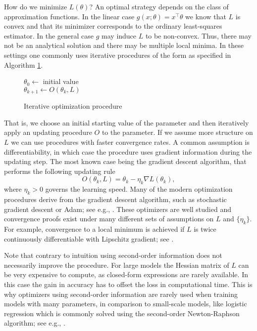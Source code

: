 How do we minimize $L(\theta)$? An optimal strategy depends on the class of
approximation functions. In the linear case $g(x; \theta) = x^\top \theta$ we know that
$L$ is convex and that its minimizer corresponds to the ordinary least-squares
estimator. In the general case $g$ may induce $L$ to be non-convex. Thus, there may not
be an analytical solution and there may be multiple local minima. In these settings one
commonly uses iterative procedures of the form as specified in Algorithm
\ref{alg:optimizer}.
\vspace{-1em}
\begin{figure}[!ht]
    \centering
    \begin{minipage}{.7\linewidth}
        \begin{algorithm}[H]
            \begin{algorithmic}[1]
                \State $\theta_0 \gets$ initial value
                \\
                $\theta_{k+1} \gets O(\theta_k, L)$
                \EndWhile
            \end{algorithmic}
        \caption{Iterative optimization procedure}
        \label{alg:optimizer}
        \end{algorithm}
    \end{minipage}
\end{figure}
That is, we choose an initial starting value of the parameter and then iteratively apply
an updating procedure $O$ to the parameter. If we assume more structure on $L$ we can
use procedures with faster convergence rates. A common assumption is differentiability,
in which case the procedure uses gradient information during the updating step. The most
known case being the gradient descent algorithm, that performs the following updating
rule
\[
    O(\theta_k, L) = \theta_k - \eta_k \nabla L(\theta_k),
\]
where $\eta_k > 0$ governs the learning speed. Many of the modern optimization
procedures derive from the gradient descent algorithm, such as stochastic gradient
descent or Adam; see e.g., \cite{Kingma.2014}. These optimizers are well studied and
convergence proofs exist under many different sets of assumptions on $L$ and
$\{\eta_k\}$. For example, convergence to a local minimum is achieved if $L$ is twice
continuously differentiable with Lipschitz gradient; see \cite{Lee.2016}.

Note that contrary to intuition using second-order information does not necessarily
improve the procedure. For large models the Hessian matrix of $L$ can be very expensive
to compute, as closed-form expressions are rarely available. In this case the gain in
accuracy has to offset the loss in computational time. This is why optimizers using
second-order information are rarely used when training models with many parameters, in
comparison to small-scale models, like logistic regression which is commonly solved
using the second-order Newton-Raphson algorithm; see e.g., \cite{Sklearn}.


